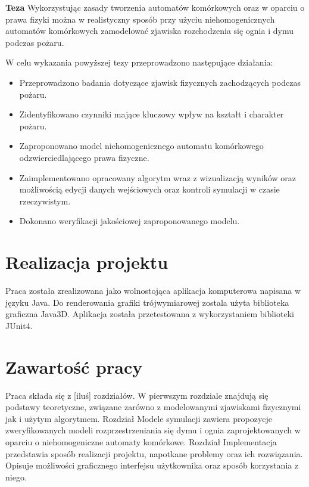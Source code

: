


\textbf{Teza} Wykorzystując zasady tworzenia automatów komórkowych oraz w oparciu o prawa fizyki można w realistyczny sposób
przy użyciu niehomogenicznych 
automatów komórkowych
zamodelować zjawiska rozchodzenia się ognia i dymu podczas pożaru.

W celu wykazania powyższej tezy przeprowadzono następujące działania:
\begin{itemize}
\item Przeprowadzono badania dotyczące zjawisk fizycznych zachodzących podczas pożaru.
\item Zidentyfikowano czynniki mające kluczowy wpływ na kształt i charakter pożaru.
\item Zaproponowano model niehomogenicznego automatu komórkowego odzwierciedlającego prawa fizyczne.
\item Zaimplementowano opracowany algorytm wraz z wizualizacją wyników oraz możliwością edycji danych wejściowych oraz kontroli symulacji w czasie rzeczywistym.
\item Dokonano weryfikacji jakościowej zaproponowanego modelu.
\end{itemize}

\section {Realizacja projektu} %
Praca została zrealizowana jako wolnostojąca aplikacja komputerowa napisana w języku Java. Do renderowania grafiki trójwymiarowej
zostala użyta biblioteka graficzna Java3D. Aplikacja została przetestowana z wykorzystaniem biblioteki JUnit4. 

\section{Zawartość pracy} %
Praca składa się z [iluś] rozdziałów. 
W pierwszym rozdziale znajdują się podstawy teoretyczne, związane zarówno z modelowanymi zjawiskami fizycznymi jak i użytym algorytmem.
Rozdział Modele symulacji zawiera propozycje zweryfikowanych modeli rozprzestrzeniania się dymu i ognia zaprojektowanych w oparciu
o niehomogeniczne automaty komórkowe. Rozdział Implementacja przedstawia sposób realizacji projektu, napotkane problemy oraz 
ich rozwiązania. Opisuje możliwości graficznego interfejsu użytkownika oraz sposób korzystania z niego.
